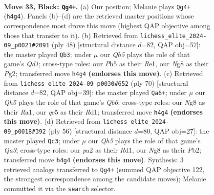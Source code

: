 \documentclass[11pt]{article}
\begin{document}
\clearpage

\begin{figure}[p]\centering
\begin{subfigure}{0.46\textwidth}\centering
\resizebox{\linewidth}{!}{%
\newchessgame
\chessboard[
  setfen={6nr/1kr3p1/8/2p1Q1Pp/2P2P1q/N3B3/PP4K1/1R6 b - - 4 33},
  showmover=false,
  pgfstyle=straightmove, color=movearrow, markmove={h4-g4}
]}
\caption{}
\end{subfigure}\hfill
\begin{subfigure}{0.46\textwidth}\centering
\resizebox{\linewidth}{!}{%
\newchessgame
\chessboard[
  setfen={r7/4ppk1/2p3p1/4bq1p/2P1N3/7P/5PP1/3QRK2 w - - 2 25},
  showmover=false,
  pgfstyle=straightmove, color=movearrow, markmove={d1-b3}
]}
\caption{}
\end{subfigure}
\\[4pt]
\begin{subfigure}{0.46\textwidth}\centering
\resizebox{\linewidth}{!}{%
\newchessgame
\chessboard[
  setfen={2kr1b2/5p2/1Q3P2/2Nq4/1p1p4/1Pp2nP1/5P2/R2R3K w - - 5 36},
  showmover=false,
  pgfstyle=straightmove, color=movearrow, markmove={b6-a6}
]}
\caption{}
\end{subfigure}\hfill
\begin{subfigure}{0.46\textwidth}\centering
\resizebox{\linewidth}{!}{%
\newchessgame
\chessboard[
  setfen={6k1/pr6/2p1pp2/3q1bp1/3P4/Q4P2/PP5R/3R2K1 w - - 2 29},
  showmover=false,
  pgfstyle=straightmove, color=movearrow, markmove={a3-c3}
]}
\caption{}
\end{subfigure}
\caption{\textbf{Move 33, Black: \texttt{Qg4+}.} (a) Our position; Melanie plays \texttt{Qg4+} (\texttt{h4g4}). Panels (b)--(d) are the retrieved master positions whose correspondence most drove this move (highest QAP objective among those that transfer to it). (b) Retrieved from \texttt{lichess\_elite\_2024-09\_p0021\#2091} (ply 48) [structural distance $d$=82, QAP obj=57]: the master played \texttt{Qb3}; under $\mu$ our \emph{Qh5} plays the role of that game's \emph{Qd1}; cross-type roles: our \emph{P}h5 as their \emph{R}e1, our \emph{N}g8 as their \emph{P}g2; transferred move \texttt{h4g4} \textbf{(endorses this move)}. (c) Retrieved from \texttt{lichess\_elite\_2024-09\_p0030\#652} (ply 70) [structural distance $d$=82, QAP obj=39]: the master played \texttt{Qa6+}; under $\mu$ our \emph{Qh5} plays the role of that game's \emph{Qb6}; cross-type roles: our \emph{N}g8 as their \emph{R}a1, our \emph{q}e5 as their \emph{R}d1; transferred move \texttt{h4g4} \textbf{(endorses this move)}. (d) Retrieved from \texttt{lichess\_elite\_2024-09\_p0018\#392} (ply 56) [structural distance $d$=80, QAP obj=27]: the master played \texttt{Qc3}; under $\mu$ our \emph{Qh5} plays the role of that game's \emph{Qa3}; cross-type roles: our \emph{p}a2 as their \emph{R}d1, our \emph{N}g8 as their \emph{P}b2; transferred move \texttt{h4g4} \textbf{(endorses this move)}. Synthesis: 3 retrieved analogs transferred to \texttt{Qg4+} (summed QAP objective 122, the strongest correspondence among the candidate moves); Melanie committed it via the \texttt{search} selector.}
\label{fig:thought-m65}
\end{figure}
\end{document}
